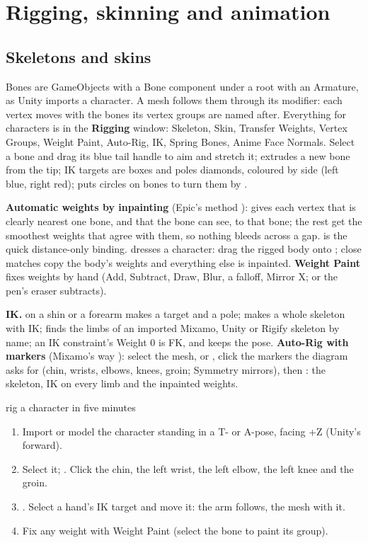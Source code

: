 \chapter{Rigging, skinning and animation}
\label{ch:animate}

\section{Skeletons and skins}
Bones are GameObjects with a Bone component under a root with an Armature, as Unity imports a character. A mesh
follows them through its  modifier: each vertex moves with the bones its vertex groups are named
after. Everything for characters is in the \textbf{Rigging} window: Skeleton, Skin, Transfer Weights, Vertex Groups,
Weight Paint, Auto-Rig, IK, Spring Bones, Anime Face Normals. Select a bone and drag its blue tail handle to aim and
stretch it;  extrudes a new bone from the tip; IK targets are boxes and poles diamonds, coloured by side
(left blue, right red);  puts circles on bones to turn them by \cite{BlenderManual2026}.

\textbf{Automatic weights by inpainting} (Epic's method \cite{Abdrashitov2023Robust}): 
gives each vertex that is clearly nearest one bone, and that the bone can see, to that bone; the rest get the
smoothest weights that agree with them, so nothing bleeds across a gap.  is the quick distance-only
binding.  dresses a character: drag the rigged body onto ; close matches copy the body's
weights and everything else is inpainted. \textbf{Weight Paint} fixes weights by hand (Add, Subtract, Draw, Blur, a
falloff, Mirror X;  or the pen's eraser subtracts).

\textbf{IK.}  on a shin or a forearm makes a target and a pole;  makes a whole skeleton with IK;  finds the limbs of an imported Mixamo, Unity or Rigify
skeleton by name; an IK constraint's Weight 0 is FK, and  keeps the pose. \textbf{Auto-Rig with
markers} (Mixamo's way \cite{Mixamo2026}): select the mesh,  or , click the
markers the diagram asks for (chin, wrists, elbows, knees, groin; Symmetry mirrors), then : the skeleton,
IK on every limb and the inpainted weights.

\begin{example}{rig a character in five minutes}
\begin{enumerate}
  \item Import or model the character standing in a T- or A-pose, facing +Z (Unity's forward).
  \item Select it; . Click the chin, the left wrist, the left elbow, the left knee
    and the groin.
  \item {}. Select a hand's IK target and move it: the arm follows, the mesh with it.
  \item Fix any weight with Weight Paint (select the bone to paint its group).
\end{enumerate}
\end{example}


